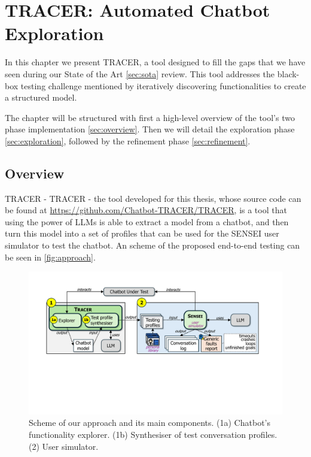 
\chapter{TRACER: Automated Chatbot Exploration}\label{chapter:tracer}

In this chapter we present \ac{TRACER},
a tool designed to fill the gaps that we have seen
during our State of the Art \autoref{sec:sota} review.
This tool addresses the black-box testing challenge mentioned
by iteratively discovering functionalities
to create a structured model.

The chapter will be structured with first
a high-level overview of the tool's two phase implementation \autoref{sec:overview}.
Then we will detail the exploration phase \autoref{sec:exploration},
followed by the refinement phase \autoref{sec:refinement}.

\section{Overview}\label{sec:overview}

\ac{TRACER} - \acl{TRACER} - the tool developed for this thesis,
whose source code can be found at \url{https://github.com/Chatbot-TRACER/TRACER},
is a tool that using the power of \acp{LLM}
is able to extract a model from a chatbot,
and then turn this model into a set of profiles
that can be used for the SENSEI
\autocite{delaraSensei, delaraAutomatedEndtoEndTesting2025} user simulator
to test the chatbot.
An scheme of the proposed end-to-end testing
can be seen in \autoref{fig:approach}.


\begin{figure}[!htpb]
  \centering
  \includegraphics[width=\linewidth]{figures/approach.pdf}
  \caption{Scheme of our approach and its main components.
    (1a) Chatbot’s functionality explorer.
    (1b) Synthesiser of test conversation profiles.
    (2) User simulator.}
  \label{fig:approach}
\end{figure}


